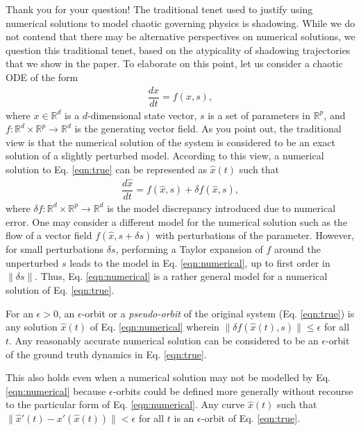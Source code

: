 \documentclass[11pt]{article}
\begin{document}
Thank you for your question! The traditional tenet used to justify using numerical solutions to model chaotic governing physics is shadowing. While we do not contend that there may be alternative perspectives on numerical solutions, we question this traditional tenet, based on the atypicality of shadowing trajectories that we show in the paper. To elaborate on this point, let us consider a chaotic ODE of the form 
\begin{align}
\label{eqn:true}
    \dfrac{d x}{dt} = f(x, s),
\end{align}
where $x \in \mathbb{R}^d$ is a $d$-dimensional state vector, $s$ is a set of
parameters in $\mathbb{R}^p$, and $f:\mathbb{R}^d \times \mathbb{R}^p \to \mathbb{R}^d$ is the generating vector field. As you point out, the traditional view is that the numerical solution of the system is considered to be an exact solution of a slightly perturbed model. According to this view, a numerical solution to Eq. \ref{eqn:true} can be represented as $\hat{x}(t)$ such that 
\begin{align}
\label{eqn:numerical}
    \dfrac{d\hat{x}}{dt} = f(\hat{x}, s) + \delta f(\hat{x},s), 
\end{align}
where $\delta f:\mathbb{R}^d \times \mathbb{R}^p \to \mathbb{R}^d$ is the model discrepancy introduced due to numerical error. One may consider a different model for the numerical solution such as the flow of a vector field $f(\hat{x}, s + \delta s)$ with perturbations of the parameter. However, for small perturbations $\delta s$, performing a Taylor expansion of $f$ around the unperturbed $s$ leads to the model in Eq. \ref{eqn:numerical}, up to first order in $\|\delta s\|$. Thus, Eq. \ref{eqn:numerical} is a rather general model for a numerical solution of Eq. \ref{eqn:true}. 

For an $\epsilon >0$, an $\epsilon$-orbit or a {\em pseudo-orbit} of the original system (Eq. \ref{eqn:true}) is any solution $\hat{x}(t)$ of Eq. \ref{eqn:numerical} wherein $\|\delta f(\hat{x}(t), s)\| \leq \epsilon$ for all $t$. Any reasonably accurate numerical solution can be considered to be an $\epsilon$-orbit of the ground truth dynamics in Eq. \ref{eqn:true}. 

This also holds even when a numerical solution may not be modelled by Eq. \ref{eqn:numerical} because $\epsilon$-orbits could be defined more generally without recourse to the particular form of Eq. \ref{eqn:numerical}. Any curve $\hat{x}(t)$ such that $\|\hat{x}'(t) - x'(\hat{x}(t))\| < \epsilon$ for all $t$ is an $\epsilon$-orbit of Eq. \ref{eqn:true}.
\end{document}
